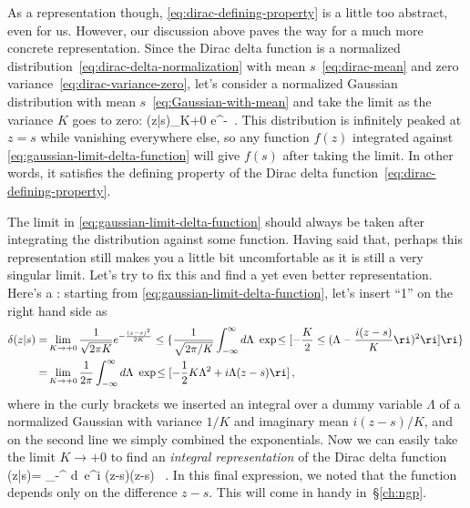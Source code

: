 As a representation though, \eqref{eq:dirac-defining-property} is
a little too abstract, even for us. However, our discussion above paves the way for a much more concrete representation. 
Since the Dirac delta function is a normalized distribution~\eqref{eq:dirac-delta-normalization} with mean $s$~\eqref{eq:dirac-mean} and zero variance~\eqref{eq:dirac-variance-zero}, 
let's
consider a normalized Gaussian distribution with mean $s$~\eqref{eq:Gaussian-with-mean}
and take the limit as the variance $K$ goes to zero:
\be\label{eq:gaussian-limit-delta-function}
\delta(z|s)\equiv\lim_{K\rightarrow +0} e^{-}\, .
\ee
This distribution is infinitely peaked at $z=s$ while vanishing everywhere else, so any function $f(z)$ integrated against \eqref{eq:gaussian-limit-delta-function} will 
give $f(s)$ after taking the limit.
In other words, it satisfies the defining property of the Dirac delta function~\eqref{eq:dirac-defining-property}.
 




The limit in \eqref{eq:gaussian-limit-delta-function} should always be taken after integrating the distribution against some function. Having said that, perhaps this representation still makes you a little bit uncomfortable as
it is still a very singular limit.
Let's try to fix this and find a yet even better representation.
Here's a : starting from \eqref{eq:gaussian-limit-delta-function}, let's insert ``1'' on the right hand side as
\begin{align}
\delta(z|s)=&\lim_{K\rightarrow +0} \frac{1}{\sqrt{2\pi K}}e^{-\frac{(z-s)^2}{2K}} \le\{\frac{1}{\sqrt{2\pi/K}} \int_{-\infty}^\infty d\Lambda\ \exp\!\le[ -\frac{K}{2}\le(\Lambda-\frac{i(z-s)}{K}\ri)^2  \ri]\ri\} \,  \\
=& \lim_{K\rightarrow +0} \frac{1}{2\pi}  \int_{-\infty}^\infty d\Lambda\ \exp\!\le[-\frac{1}{2}K \Lambda^2 + i \Lambda(z-s) \ri] \, , \notag
\end{align}
where in the curly brackets we inserted an integral over a dummy variable $\Lambda$ of a normalized Gaussian with variance $1/K$ and imaginary mean $i(z-s)/K$, and on the second line we simply combined the exponentials.  Now we can easily take the limit $K\to+0$ to find an \emph{integral representation} of the Dirac delta function
\be\label{eq:integral-form-delta-function}
\delta(z|s)= \int_{-\infty}^{\infty} d\Lambda\ e^{i \Lambda(z-s)}\equiv \delta(z-s) \, .
\ee
In this final expression, we noted that the function depends only on the difference $z-s$.
This  will come in handy in~\S\ref{ch:ngp}.

